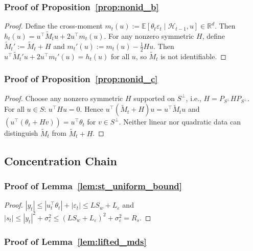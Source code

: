 \documentclass{article}
\newcommand{\R}{\mathbb{R}}
\newcommand{\E}{\mathbb{E}}
\newcommand{\cH}{\mathcal{H}}
\begin{document}
\subsubsection{Proof of Proposition~\ref{prop:nonid_b}}
\label{proof:nonid_b}

\begin{proof}
Define the cross-moment $m_t(u) := \E[\theta_t \varepsilon_t \mid \cH_{t-1}, u] \in \R^d$.
Then $h_t(u) = u^\top \widetilde{M}_t u + 2u^\top m_t(u)$.
For any nonzero symmetric $H$, define $\widetilde{M}_t' := \widetilde{M}_t + H$ and $m_t'(u) := m_t(u) - \tfrac{1}{2}Hu$.
Then $u^\top \widetilde{M}_t' u + 2u^\top m_t'(u) = h_t(u)$ for all $u$, so $\widetilde{M}_t$ is not identifiable.
\end{proof}

\subsubsection{Proof of Proposition~\ref{prop:nonid_c}}
\label{proof:nonid_c}

\begin{proof}
Choose any nonzero symmetric $H$ supported on $S^\perp$, i.e., $H = P_{S^\perp} H P_{S^\perp}$.
For all $u \in S$: $u^\top H u = 0$.
Hence $u^\top(\widetilde{M}_t + H)u = u^\top \widetilde{M}_t u$ and $(u^\top(\theta_t + Hv)) = u^\top \theta_t$ for $v \in S^\perp$.
Neither linear nor quadratic data can distinguish $\widetilde{M}_t$ from $\widetilde{M}_t + H$.
\end{proof}

\subsection{Concentration Chain}

\subsubsection{Proof of Lemma~\ref{lem:st_uniform_bound}}
\label{proof:st_uniform_bound}

\begin{proof}
$|y_t| \le |u_t^\top \theta_t| + |\varepsilon_t| \le LS_w + L_\varepsilon$ and $|s_t| \le |y_t|^2 + \sigma_\varepsilon^2 \le (LS_w + L_\varepsilon)^2 + \sigma_\varepsilon^2 = R_s$.
\end{proof}

\subsubsection{Proof of Lemma~\ref{lem:lifted_mds}}
\label{proof:lifted_mds}
\end{document}

